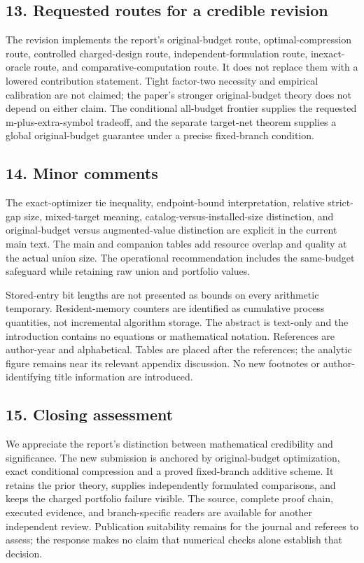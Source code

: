 \documentclass[11pt,letterpaper]{article}
\begin{document}
\subsection*{13. Requested routes for a credible revision}


The revision implements the report's original-budget route, optimal-compression route, controlled charged-design route, independent-formulation route, inexact-oracle route, and comparative-computation route. It does not replace them with a lowered contribution statement. Tight factor-two necessity and empirical calibration are not claimed; the paper's stronger original-budget theory does not depend on either claim. The conditional all-budget frontier supplies the requested m-plus-extra-symbol tradeoff, and the separate target-net theorem supplies a global original-budget guarantee under a precise fixed-branch condition.



\subsection*{14. Minor comments}


The exact-optimizer tie inequality, endpoint-bound interpretation, relative strict-gap size, mixed-target meaning, catalog-versus-installed-size distinction, and original-budget versus augmented-value distinction are explicit in the current main text. The main and companion tables add resource overlap and quality at the actual union size. The operational recommendation includes the same-budget safeguard while retaining raw union and portfolio values.



Stored-entry bit lengths are not presented as bounds on every arithmetic temporary. Resident-memory counters are identified as cumulative process quantities, not incremental algorithm storage. The abstract is text-only and the introduction contains no equations or mathematical notation. References are author-year and alphabetical. Tables are placed after the references; the analytic figure remains near its relevant appendix discussion. No new footnotes or author-identifying title information are introduced.



\subsection*{15. Closing assessment}


We appreciate the report's distinction between mathematical credibility and significance. The new submission is anchored by original-budget optimization, exact conditional compression and a proved fixed-branch additive scheme. It retains the prior theory, supplies independently formulated comparisons, and keeps the charged portfolio failure visible. The source, complete proof chain, executed evidence, and branch-specific readers are available for another independent review. Publication suitability remains for the journal and referees to assess; the response makes no claim that numerical checks alone establish that decision.
\end{document}
